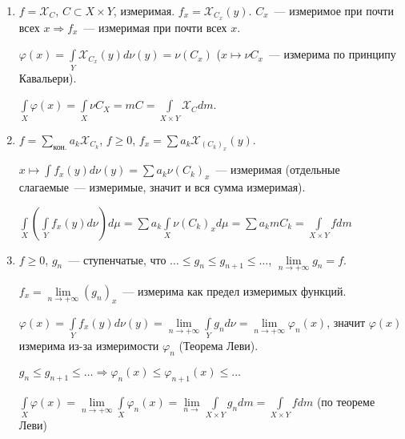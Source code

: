\documentclass{article}
\begin{document}
            \begin{enumerate}
            
                \item $f = \mathcal{X}_C$, $C \subset X \times Y$, измеримая. $f_x = \mathcal{X}_{C_x} (y)$. $C_x$~--- измеримое при почти всех $x \Rightarrow f_x$~--- измеримая при почти всех $x$.
                
                    $\varphi(x) = \int\limits_{Y} \mathcal{X}_{C_x} (y) d \nu (y) = \nu (C_x)$ ($x \mapsto \nu C_x$~--- измерима по принципу Кавальери).
                    
                    $\int\limits_{X} \varphi(x) = \int\limits_{X} \nu C_X = m C = \int\limits_{X \times Y} \mathcal{X}_C d m$.
                
                \item $f = \sum\limits_{\text{кон.}} a_k \mathcal{X}_{C_k}$, $f \geqslant 0$, $f_x = \sum a_k \mathcal{X}_{(C_k)_x} (y)$.
                    
                    $x \mapsto \int f_x(y) d \nu(y) = \sum a_k \nu (C_k)_x$~--- измеримая (отдельные слагаемые~--- измеримые, значит и вся сумма измеримая).
                    
                    $\int\limits_X \left( \int\limits_{Y} f_x(y) d \nu \right) d \mu = \sum a_k \int\limits_X \nu (C_k)_x d \mu = \sum a_k m C_k = \int\limits_{X \times Y} f d m$
                    
                \item $f \geqslant 0$, $g_n$~--- ступенчатые, что $\ldots \leqslant g_n \leqslant g_{n + 1} \leqslant \ldots$, $\lim\limits_{n \rightarrow +\infty} g_n = f$.
                
                    $f_x = \lim\limits_{n \rightarrow +\infty} (g_n)_x$~--- измерима как предел измеримых функций.
                    
                    $\varphi(x) = \int\limits_Y f_x(y) d \nu (y) = \lim\limits_{n \rightarrow +\infty} \int\limits_{Y} g_n d \nu = \lim\limits_{n \rightarrow +\infty} \varphi_n(x)$, значит $\varphi(x)$ измерима из-за измеримости $\varphi_n$ (Теорема Леви).
                
                    $g_n \leqslant g_{n + 1} \leqslant \ldots \Rightarrow \varphi_n(x) \leqslant \varphi_{n + 1} (x) \leqslant \ldots$
                    
                    $\int\limits_{X} \varphi(x) = \lim\limits_{n \rightarrow +\infty} \int\limits_{X} \varphi_n(x) = \lim\limits_{n \rightarrow} \int\limits_{X \times Y} g_n d m = \int\limits_{X \times Y} f dm$ (по теореме Леви)
                    
            \end{enumerate}
        
\end{document}
